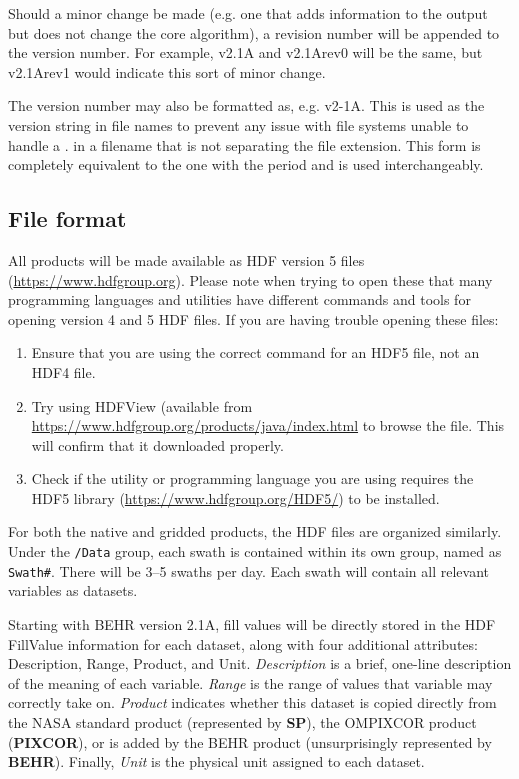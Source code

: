 \documentclass[12pt]{article}
\begin{document}
	Should a minor change be made (e.g. one that adds information to the output but
does not change the core algorithm), a revision number will be appended to the
version number. For example, v2.1A and v2.1Arev0 will be the same, but v2.1Arev1
would indicate this sort of minor change.

	The version number may also be formatted as, e.g. v2-1A. This is used as the version
string in file names to prevent any issue with file systems unable to handle a . in
a filename that is not separating the file extension. This form is completely
equivalent to the one with the period and is used interchangeably.
	
	\subsection{File format}
	All products will be made available as HDF version 5 files (\url{https://www.hdfgroup.org}).  Please note when trying to open these that many programming languages and utilities have different commands and tools for opening version 4 and 5 HDF files. If you are having trouble opening these files:
	\begin{enumerate}
		\item Ensure that you are using the correct command for an HDF5 file, not an HDF4 file.
		\item Try using HDFView (available from \url{https://www.hdfgroup.org/products/java/index.html} to browse the file. This will confirm that it downloaded properly.
		\item Check if the utility or programming language you are using requires the HDF5 library (\url{https://www.hdfgroup.org/HDF5/}) to be installed. 
	\end{enumerate}
	
	For both the native and gridded products, the HDF files are organized similarly. Under the \texttt{/Data} group, each swath is contained within its own group, named as \texttt{Swath\#}. There will be 3--5 swaths per day. Each swath will contain all relevant variables as datasets.
	
	Starting with BEHR version 2.1A, fill values will be directly stored in the HDF FillValue information for each dataset, along with four additional attributes: Description, Range, Product, and Unit.  \emph{Description} is a brief, one-line description of the meaning of each variable. \emph{Range} is the range of values that variable may correctly take on. \emph{Product} indicates whether this dataset is copied directly from the NASA standard product (represented by \textbf{SP}), the OMPIXCOR product (\textbf{PIXCOR}), or is added by the BEHR product (unsurprisingly represented by \textbf{BEHR}). Finally, \emph{Unit} is the physical unit assigned to each dataset. 
	
\end{document}
